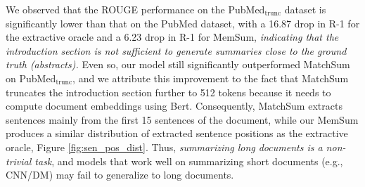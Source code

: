 \documentclass[11pt]{article}
\begin{document}
We observed that the ROUGE performance on the PubMed$_\text{trunc}$ dataset is significantly lower than that on the PubMed dataset, with a 16.87 drop in R-1 for the extractive oracle and a 6.23 drop in R-1 for MemSum,\textit{ indicating that the introduction section is not sufficient to generate summaries close to the ground truth (abstracts).}
Even so, our model still significantly outperformed MatchSum on PubMed$_\text{trunc}$, and we attribute this improvement to the fact that MatchSum truncates the introduction section further to 512 tokens because it needs to compute document embeddings using Bert. 
Consequently, MatchSum extracts sentences mainly from the first 15 sentences of the document, while our MemSum produces a similar distribution of extracted sentence positions as the extractive oracle,
Figure \ref{fig:sen_pos_dist}. Thus, \textit{summarizing long documents is a non-trivial task}, and models that work well on summarizing short documents (e.g., CNN/DM) may fail to generalize to long documents.
\end{document}
